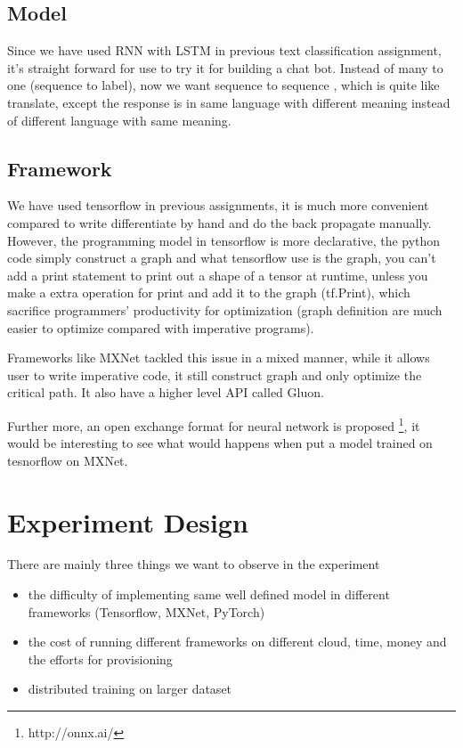 \documentclass[11pt,letterpaper,twocolumn,oneside]{article}
\begin{document}
\subsection{Model}

Since we have used RNN with LSTM in previous text classification assignment,
it's straight forward for use to try it for building a chat bot.
Instead of many to one (sequence to label), now we want sequence to sequence \cite{sutskever2014sequence},
which is quite like translate, except the response is in same language with different meaning
instead of different language with same meaning.

\subsection{Framework}

We have used tensorflow \cite{abadi2016tensorflow} in previous assignments, it is much more convenient
compared to write differentiate by hand and do the back propagate manually.
However, the programming model in tensorflow is more declarative, the python
code simply construct a graph and what tensorflow use is the graph, you can't
add a print statement to print out a shape of a tensor at runtime, unless you
make a extra operation for print and add it to the graph (tf.Print),
which sacrifice programmers' productivity for optimization (graph definition are much
easier to optimize compared with imperative programs).

Frameworks like MXNet \cite{chen2015mxnet} tackled this issue in a mixed manner,
while it allows user to write imperative code, it still construct graph and only
optimize the critical path. It also have a higher level API called Gluon.

Further more, an open exchange format for neural network is proposed \footnote{http://onnx.ai/},
it would be interesting to see what would happens when put a model trained on tesnorflow on MXNet.

\section{Experiment Design}

There are mainly three things we want to observe in the experiment

\begin{itemize}
  \item the difficulty of implementing same well defined model in different frameworks (Tensorflow, MXNet, PyTorch)
  \item the cost of running different frameworks on different cloud, time, money and the efforts for provisioning
  \item distributed training on larger dataset
\end{itemize}
\end{document}
